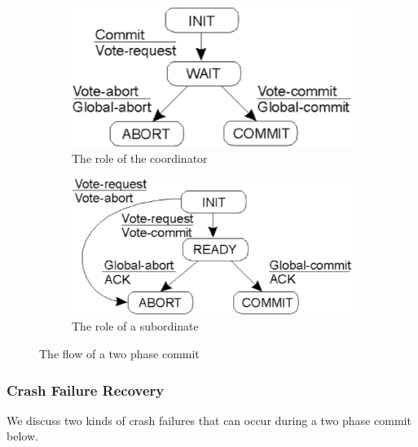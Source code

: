 \documentclass[twoside]{article}
\begin{document}
\begin{figure}[h]
    \centering
    \begin{subfigure}{.5\textwidth}
        \includegraphics[width=\textwidth]{two-phase-commit-coordinator-diagram.png}
    	\caption{The role of the coordinator}
    	\label{fig:two-phase-commit-coordinator-diagram}
    \end{subfigure}%
    \begin{subfigure}{.5\textwidth}
        \includegraphics[width=\textwidth]{two-phase-commit-subordinate-diagram.png}
    	\caption{The role of a subordinate}
    	\label{fig:two-phase-commit-subordinate-diagram}
    \end{subfigure}
    \caption{The flow of a two phase commit}
\end{figure}

\subsubsection{Crash Failure Recovery}

We discuss two kinds of crash failures that can occur during a two phase commit below.
\end{document}
